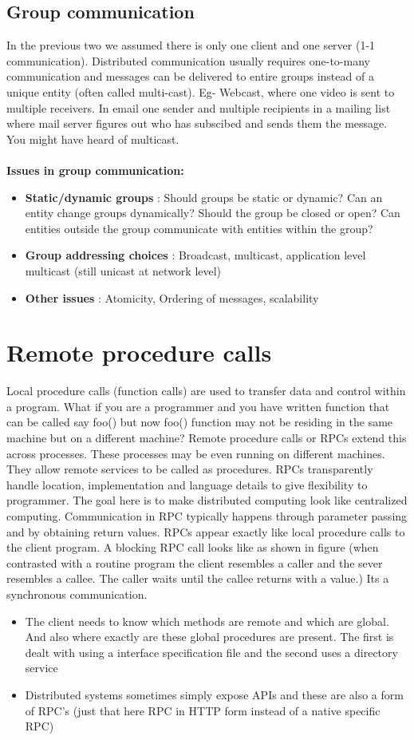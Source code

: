\documentclass[twoside]{article}
\begin{document}
\subsection{Group communication}
In the previous two we assumed there is only one client and one server (1-1 communication). Distributed communication usually requires one-to-many communication and messages can be delivered to entire groups instead of a unique entity (often called multi-cast). Eg- Webcast, where one video is sent to multiple receivers. In email one sender and multiple recipients in a mailing list where mail server figures out who has subscibed and sends them the message. You might have heard of multicast.\\\\
\textbf{Issues in group communication: }
\begin{itemize}
  \item \textbf{Static/dynamic groups} : Should groups be static or dynamic? Can an entity change groups dynamically? Should the group be closed or open? Can entities outside the group communicate with entities within the group?
  \item \textbf{Group addressing choices} : Broadcast, multicast, application level multicast (still unicast at network level)
  \item \textbf{Other issues} : Atomicity, Ordering of messages, scalability
\end{itemize}

\section{Remote procedure calls}
Local procedure calls (function calls) are used to transfer data and control within a program. What if you are a programmer and you have written function that can be called say foo() but now foo() function may not be residing in the same machine but on a different machine? Remote procedure calls or RPCs extend this across processes. These processes may be even running on different machines. They allow remote services to be called as procedures. RPCs transparently handle location, implementation and language details to give flexibility to programmer. The goal here is to make distributed computing look like centralized computing. Communication in RPC typically happens through parameter passing and by obtaining return values. RPCs appear exactly like local procedure calls to the client program. A blocking RPC call looks like as shown in figure (when contrasted with a routine program the client resembles a caller and the sever resembles a callee. The caller waits until the callee returns with a value.) Its a synchronous communication.
\begin{itemize}
    \item The client needs to know which methods are remote and which are global. And also where exactly are these global procedures are present. The first is dealt with using a interface specification file and the second uses a directory service
    \item Distributed systems sometimes simply expose APIs and these are also a form of RPC's (just that here RPC in HTTP form instead of a native specific RPC)
\end{itemize}
\end{document}
